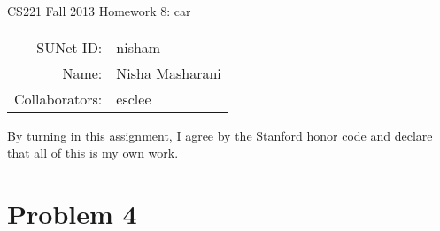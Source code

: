 \documentclass[12pt]{article}
\begin{document}
\begin{center}
{\Large CS221 Fall 2013 Homework 8: car}

\begin{tabular}{rl}
SUNet ID: & nisham \\
Name: & Nisha Masharani \\
Collaborators: & esclee
\end{tabular}
\end{center}

By turning in this assignment, I agree by the Stanford honor code and declare
that all of this is my own work.

\section*{Problem 4}
\end{document}
